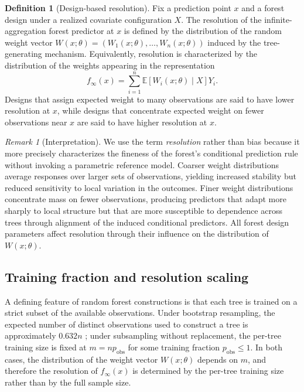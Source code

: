 \documentclass[11pt]{article}
\theoremstyle{plain}
\theoremstyle{definition}
\newtheorem{definition}{Definition}
\theoremstyle{remark}
\newtheorem{remark}{Remark}
\begin{document}
\begin{definition}[Design-based resolution]
	\label{def:resolution}
	Fix a prediction point $x$ and a forest design under a realized covariate configuration $X$. The resolution of the infinite-aggregation forest predictor at $x$ is defined by the distribution of the random weight vector $W(x;\theta)=(W_1(x;\theta),\ldots,W_n(x;\theta))$ induced by the tree-generating mechanism. Equivalently, resolution is characterized by the distribution of the weights appearing in the representation
	\[
	f_\infty(x)
	=
	\sum_{i=1}^n \mathbb E\!\left[W_i(x;\theta)\mid X\right]Y_i.
	\]
	Designs that assign expected weight to many observations are said to have lower resolution at $x$, while designs that concentrate expected weight on fewer observations near $x$ are said to have higher resolution at $x$.
\end{definition}

\begin{remark}[Interpretation]
	\label{rem:resolution}
	We use the term \emph{resolution} rather than bias because it more precisely characterizes the fineness of the forest's conditional prediction rule without invoking a parametric reference model. Coarser weight distributions average responses over larger sets of observations, yielding increased stability but reduced sensitivity to local variation in the outcomes. Finer weight distributions concentrate mass on fewer observations, producing predictors that adapt more sharply to local structure but that are more susceptible to dependence across trees through alignment of the induced conditional predictors. All forest design parameters affect resolution through their influence on the distribution of $W(x;\theta)$.
\end{remark}

\subsection{Training fraction and resolution scaling}
\label{subsec:training_fraction_resolution}

A defining feature of random forest constructions is that each tree is trained on a strict subset of the available observations. Under bootstrap resampling, the expected number of distinct observations used to construct a tree is approximately $0.632n$ \citep{efron1983}; under subsampling without replacement, the per-tree training size is fixed at $m=np_{\mathrm{obs}}$ for some training fraction $p_{\mathrm{obs}}\leq1$. In both cases, the distribution of the weight vector $W(x;\theta)$ depends on $m$, and therefore the resolution of $f_\infty(x)$ is determined by the per-tree training size rather than by the full sample size.
\end{document}
